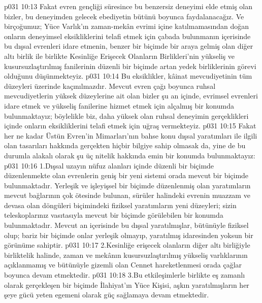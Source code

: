 \vs p031 10:13 Fakat evren gençliği süresince bu benzersiz deneyimi elde etmiş olan bizler, bu deneyimden gelecek ebediyetin bütünü boyunca faydalanacağız. Ve birçoğumuz; Yüce Varlık’ın zaman\hyp{}mekân evrimi içine katılmamasından doğan onların deneyimsel eksikliklerini telafi etmek için çabada bulunmanın içerisinde bu dışsal evrenleri idare etmenin, benzer bir biçimde bir araya gelmiş olan diğer altı birlik ile birlikte Kesinliğe Erişecek Olanların Birlikleri’nin yükseliş ve kusursuzlaştırılmış fanilerinin düzenli bir biçimde artan yedek birliklerinin görevi olduğunu düşünmekteyiz.
\vs p031 10:14 Bu eksiklikler, kâinat mevcudiyetinin tüm düzeyleri üzerinde kaçınılmazdır. Mevcut evren çağı boyunca ruhsal mevcudiyetlerin yüksek düzeylerine ait olan bizler şu an içinde, evrimsel evrenleri idare etmek ve yükseliş fanilerine hizmet etmek için alçalmış bir konumda bulunmaktayız; böylelikle biz, daha yüksek olan ruhsal deneyimin gerçeklikleri içinde onların eksikliklerini telafi etmek için uğraş vermekteyiz.
\vs p031 10:15 Fakat her ne kadar Üstün Evren’in Mimarları’nın bahse konu dışsal yaratımları ile ilgili olan tasarıları hakkında gerçekten hiçbir bilgiye sahip olmasak da, yine de bu durumla alakalı olarak şu üç nitelik hakkında emin bir konumda bulunmaktayız:
\vs p031 10:16 1.\bibnobreakspace Dışsal uzayın nüfuz alanları içinde düzenli bir biçimde düzenlenmekte olan evrenlerin geniş bir yeni sistemi orada mevcut bir biçimde bulunmaktadır. Yerleşik ve işleyişsel bir biçimde düzenlenmiş olan yaratımların mevcut bağlarının çok ötesinde bulunan, sürüler halindeki evrenin muazzam ve devasa olan döngüleri biçimindeki fiziksel yaratımların yeni düzeyleri; sizin teleskoplarınız vasıtasıyla mevcut bir biçimde görülebilen bir konumda bulunmaktadır. Mevcut an içerisinde bu dışsal yaratılmışlar, bütünüyle fiziksel olup; bariz bir biçimde onlar yerleşik olmayıp, yaratılmış idaresinden yoksun bir görünüme sahiptir.
\vs p031 10:17 2.\bibnobreakspace Kesinliğe erişecek olanların diğer altı birliğiyle birliktelik halinde, zaman ve mekânın kusursuzlaştırılmış yükseliş varlıklarının açıklanmamış ve bütünüyle gizemli olan Cennet hareketlenmesi orada çağlar boyunca devam etmektedir.
\vs p031 10:18 3.\bibnobreakspace Bu etkileşimlerle birlikte eş zamanlı olarak gerçekleşen bir biçimde İlahiyat’ın Yüce Kişisi, aşkın yaratılmışların her şeye gücü yeten egemeni olarak güç sağlamaya devam etmektedir.
